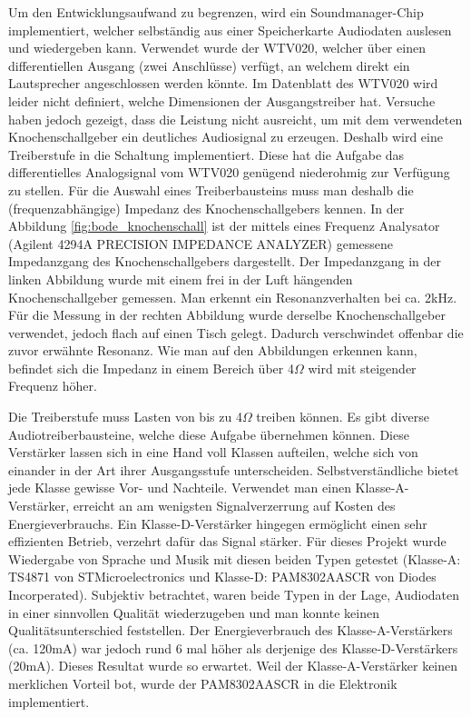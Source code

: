   Um den Entwicklungsaufwand zu begrenzen, wird ein Soundmanager-Chip implementiert, welcher selbständig aus einer Speicherkarte Audiodaten auslesen und wiedergeben kann. Verwendet wurde der WTV020, welcher über einen differentiellen Ausgang (zwei Anschlüsse) verfügt, an welchem direkt ein Lautsprecher angeschlossen werden könnte. 
  Im Datenblatt des WTV020 wird leider nicht definiert, welche Dimensionen der Ausgangstreiber hat. 
  Versuche haben jedoch gezeigt, dass die Leistung nicht ausreicht, um mit dem verwendeten Knochenschallgeber ein deutliches Audiosignal zu erzeugen. 
  Deshalb wird eine Treiberstufe in die Schaltung implementiert. 
  Diese hat die Aufgabe das differentielles Analogsignal vom WTV020 genügend niederohmig zur Verfügung zu stellen. 
  Für die Auswahl eines Treiberbausteins muss man deshalb die (frequenzabhängige) Impedanz des Knochenschallgebers kennen. 
  In der Abbildung \ref{fig:bode_knochenschall} ist der mittels eines Frequenz Analysator (Agilent 4294A PRECISION IMPEDANCE ANALYZER) gemessene Impedanzgang des Knochenschallgebers dargestellt. 
  Der Impedanzgang in der linken Abbildung wurde mit einem frei in der Luft hängenden Knochenschallgeber gemessen. Man erkennt ein Resonanzverhalten bei ca. 2kHz. 
  Für die Messung in der rechten Abbildung wurde derselbe Knochenschallgeber verwendet, jedoch flach auf einen Tisch gelegt. 
  Dadurch verschwindet offenbar die zuvor erwähnte Resonanz. 
  Wie man auf den Abbildungen erkennen kann, befindet sich die Impedanz in einem Bereich über 4\(\Omega\) wird mit steigender Frequenz höher. 
  
  
  Die Treiberstufe muss Lasten von bis zu 4\(\Omega\) treiben können. 
  Es gibt diverse Audiotreiberbausteine, welche diese Aufgabe übernehmen können. 
  Diese Verstärker lassen sich in eine Hand voll Klassen aufteilen, welche sich von einander in der Art ihrer Ausgangsstufe unterscheiden. 
  Selbstverständliche bietet jede Klasse gewisse Vor- und Nachteile. 
  Verwendet man einen Klasse-A-Verstärker, erreicht an am wenigsten Signalverzerrung auf Kosten des Energieverbrauchs. 
  Ein Klasse-D-Verstärker hingegen ermöglicht einen sehr effizienten Betrieb, verzehrt dafür das Signal stärker. 
  Für dieses Projekt wurde Wiedergabe von Sprache und Musik mit diesen beiden Typen getestet (Klasse-A: TS4871 von STMicroelectronics und Klasse-D: PAM8302AASCR von Diodes Incorperated). 
  Subjektiv betrachtet, waren beide Typen in der Lage, Audiodaten in einer sinnvollen Qualität wiederzugeben und man konnte keinen Qualitätsunterschied feststellen. Der Energieverbrauch des Klasse-A-Verstärkers (ca. 120mA) war jedoch rund 6 mal höher als derjenige des Klasse-D-Verstärkers (20mA).
  Dieses Resultat wurde so erwartet. Weil der Klasse-A-Verstärker keinen merklichen Vorteil bot, wurde der PAM8302AASCR in die Elektronik implementiert.
  
